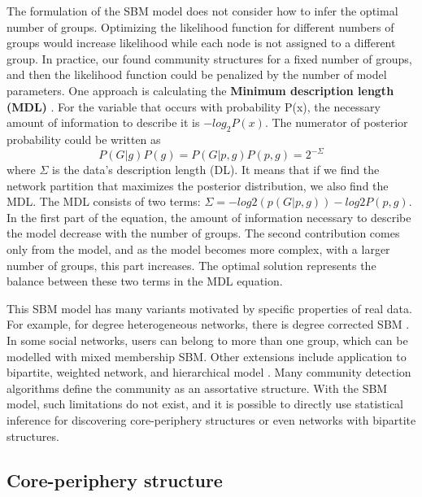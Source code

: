The formulation of the SBM model does not consider how to infer the optimal number of groups. Optimizing the likelihood function for different numbers of groups would increase likelihood while each node is not assigned to a different group. In practice, our found community structures for a fixed number of groups, and then the likelihood function could be penalized by the number of model parameters. One approach is calculating the \textbf{Minimum description length (MDL)} \cite{peixoto2019bayesian}. For the variable that occurs with probability P(x), the necessary amount of information to describe it is $-log_2P(x)$. The numerator of posterior probability could be written as
\begin{equation}
P(G|g)P(g) = P(G|p, g)P(p, g)=2^{-\Sigma}
\end{equation}
where $\Sigma$ is the data's description length (DL). It means that if we find the network partition that maximizes the posterior distribution, we also find the MDL. The MDL consists of two terms: $\Sigma = -log2(p(G|p,g))-log2P(p,g)$. In the first part of the equation, the amount of information necessary to describe the model decrease with the number of groups. The second contribution comes only from the model, and as the model becomes more complex, with a larger number of groups, this part increases. The optimal solution represents the balance between these two terms in the MDL equation.  

This SBM model has many variants motivated by specific properties of real data. For example, for degree heterogeneous networks, there is degree corrected SBM \cite{karrer2011stochastic}. In some social networks, users can belong to more than one group, which can be modelled with mixed membership SBM. Other extensions include application to bipartite, weighted network, and hierarchical model \cite{funke2019}. Many community detection algorithms define the community as an assortative structure. With the SBM model, such limitations do not exist, and it is possible to directly use statistical inference for discovering core-periphery structures or even networks with bipartite structures.  

\subsection{Core-periphery structure}

